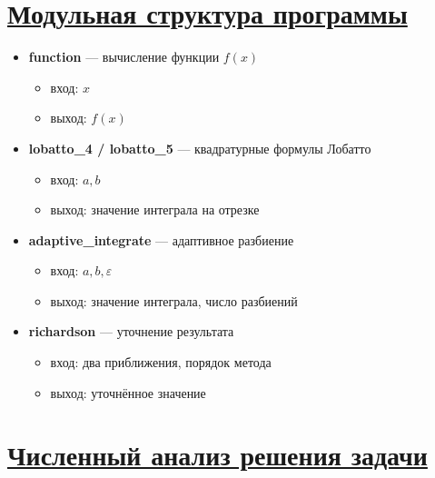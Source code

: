 \documentclass[14pt]{extarticle}
\begin{document}
	
	\section{\Large \underline{Модульная структура программы}}
	
	\begin{itemize}
		\item \textbf{function} — вычисление функции $f(x)$
		\begin{itemize}
			\item вход: $x$
			\item выход: $f(x)$
		\end{itemize}
		
		\item \textbf{lobatto\_4 / lobatto\_5} — квадратурные формулы Лобатто
		\begin{itemize}
			\item вход: $a, b$
			\item выход: значение интеграла на отрезке
		\end{itemize}
		
		\item \textbf{adaptive\_integrate} — адаптивное разбиение
		\begin{itemize}
			\item вход: $a, b, \varepsilon$
			\item выход: значение интеграла, число разбиений
		\end{itemize}
		
		\item \textbf{richardson} — уточнение результата
		\begin{itemize}
			\item вход: два приближения, порядок метода
			\item выход: уточнённое значение
		\end{itemize}
	\end{itemize}
	
	
	\newpage
	\section{\Large \underline{Численный анализ решения задачи}}
	
\end{document}
